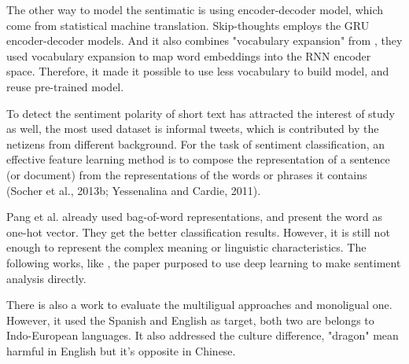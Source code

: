 The other way to model the sentimatic is using encoder-decoder model, which come from statistical machine translation. Skip-thoughts\cite{kiros2015skip} employs the GRU encoder-decoder models.
And it also combines "vocabulary expansion" from \cite{MikolovLS13}, they used vocabulary expansion to map word embeddings into the RNN encoder space.
Therefore, it made it possible to use less vocabulary to build model, and reuse pre-trained model.

To detect the sentiment polarity of short text has attracted the interest of study as well, the most used dataset is informal tweets, which is contributed by the netizens from different background. 
For the task of sentiment classification, an effective feature learning method is to compose the representation of a
sentence (or document) from the representations of the words or phrases it contains (Socher et al., 2013b; Yessenalina and Cardie, 2011).

Pang et al. \cite{pang2002thumbs} already used bag-of-word representations, and present the word as one-hot vector. They get the better classification results. However, it is still not enough to represent the complex meaning or linguistic characteristics.
The following works, like \cite{tang2014learning}, the paper purposed to use deep learning to make sentiment analysis directly.

There is also a work\cite{multilingual} to evaluate the multiligual approaches and monoligual one. However, it used the Spanish and English as target, both two are belongs 
to Indo-European languages. It also addressed the culture difference, "dragon" mean harmful in English but it's opposite in Chinese. 
